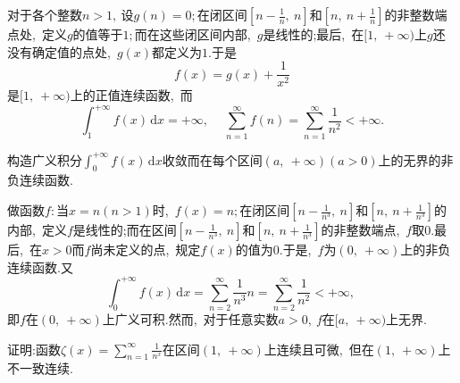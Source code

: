 	\begin{solution}
		对于各个整数$n>1,\ $设$g(n)=0;$在闭区间$\left[n-\frac{1}{n},\ n\right]$和$\left[n,\ n+\frac{1}{n}\right]$的非整数端点处,\ 定义$g$的值等于$1;$而在这些闭区间内部,\ $g$是线性的;最后,\ 在$[1,\ +\infty)$上$g$还没有确定值的点处,\ $g(x)$都定义为$1.$于是
		$$f(x)=g(x)+\frac{1}{x^2}$$
		是$[1,\ +\infty)$上的正值连续函数,\ 而
		$$\int_{1}^{+\infty}f(x)\,\text{d}x=+\infty,\ \quad\sum\limits_{n=1}^{\infty}f(n)=\sum\limits_{n=1}^{\infty}\frac{1}{n^2}<+\infty.$$ 
	\end{solution}
	\newpage
	\begin{problem}
		构造广义积分$\int_{0}^{+\infty}f(x)\,\text{d}x$收敛而在每个区间$\left(a,\ +\infty\right)(a>0)$上的无界的非负连续函数.
	\end{problem}
	
	\begin{solution}
		做函数$f:$当$x=n(n>1)$时,\ $f(x)=n;$在闭区间$\left[n-\frac{1}{n^3},\ n\right]$和$\left[n,\ n+\frac{1}{n^3}\right]$的内部,\ 定义$f$是线性的;而在区间$\left[n-\frac{1}{n^3},\ n\right]$和$\left[n,\ n+\frac{1}{n^3}\right]$的非整数端点,\ $f$取$0.$最后,\ 在$x>0$而$f$尚未定义的点,\ 规定$f(x)$的值为$0.$于是,\ $f$为$\left(0,\ +\infty\right)$上的非负连续函数.又
		$$\int_{0}^{+\infty}f(x)\,\text{d}x=\sum\limits_{n=2}^{\infty}\frac{1}{n^3}n=\sum\limits_{n=2}^{\infty}\frac{1}{n^2}<+\infty,\ $$
		即$f$在$\left(0,\ +\infty\right)$上广义可积.然而,\ 对于任意实数$a>0,\ f$在$[a,\ +\infty)$上无界. 
	\end{solution}
	\newpage
	\begin{problem}
		证明:函数$\zeta(x)=\sum\limits_{n=1}^{\infty}\frac{1}{n^x}$在区间$\left(1,\ +\infty\right)$上连续且可微,\ 但在$\left(1,\ +\infty\right)$上不一致连续.
	\end{problem}
	
